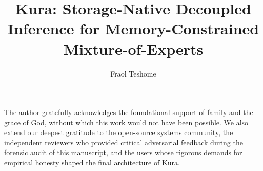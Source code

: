 \documentclass[sigplan,nonacm]{acmart}
\title{Kura: Storage-Native Decoupled Inference for Memory-Constrained Mixture-of-Experts}
\author{Fraol Teshome}
\affiliation{%
  \institution{Independent Researcher}
  \country{Ethiopia}
}
\begin{document}
\begin{abstract}

\end{abstract}


\maketitle
\pagestyle{plain}
















\begin{acks}
The author gratefully acknowledges the foundational support of family and the grace of God, without which this work would not have been possible. We also extend our deepest gratitude to the open-source systems community, the independent reviewers who provided critical adversarial feedback during the forensic audit of this manuscript, and the users whose rigorous demands for empirical honesty shaped the final architecture of Kura.
\end{acks}




\appendix



\end{document}
